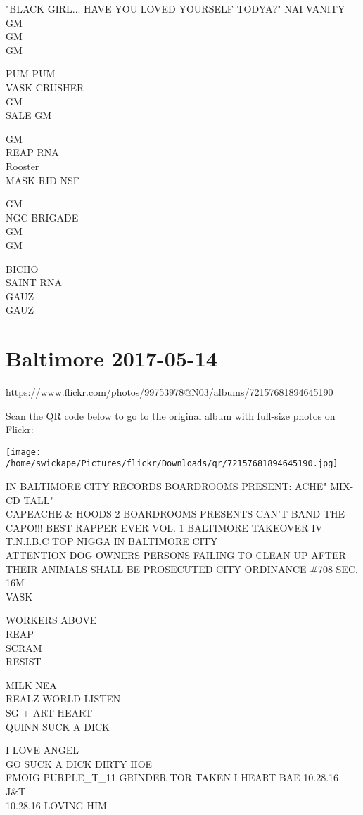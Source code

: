 \documentclass[10pt,letterpaper]{article}
\begin{document}
"BLACK GIRL... HAVE YOU LOVED YOURSELF TODYA?"  NAI VANITY\\
GM\\
GM\\
GM

PUM PUM\\
VASK CRUSHER\\
GM\\
SALE GM

GM\\
REAP RNA\\
Rooster\\
MASK RID NSF

GM\\
NGC BRIGADE\\
GM\\
GM

BICHO\\
SAINT RNA\\
GAUZ\\
GAUZ


\section*{Baltimore 2017-05-14}

\url{https://www.flickr.com/photos/99753978@N03/albums/72157681894645190}

Scan the QR code below to go to the original album with full-size photos on Flickr:

\texttt{[image: /home/swickape/Pictures/flickr/Downloads/qr/72157681894645190.jpg]}


IN BALTIMORE CITY RECORDS BOARDROOMS PRESENT: ACHE" MIX{-}CD TALL"\\
CAPEACHE \& HOODS 2 BOARDROOMS PRESENTS CAN'T BAND THE CAPO!!! BEST RAPPER EVER VOL. 1 BALTIMORE TAKEOVER IV T.N.I.B.C TOP NIGGA IN BALTIMORE CITY\\
ATTENTION DOG OWNERS PERSONS FAILING TO CLEAN UP AFTER THEIR ANIMALS SHALL BE PROSECUTED CITY ORDINANCE \#708 SEC. 16M\\
VASK

WORKERS ABOVE\\
REAP\\
SCRAM\\
RESIST

MILK NEA\\
REALZ WORLD LISTEN\\
SG + ART HEART\\
QUINN SUCK A DICK

I LOVE ANGEL\\
GO SUCK A DICK DIRTY HOE\\
FMOIG PURPLE\_T\_11 GRINDER TOR TAKEN I HEART BAE  10.28.16 J\&T\\
10.28.16 LOVING HIM
\end{document}
